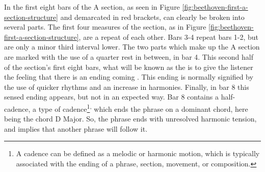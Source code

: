 In the first eight bars of the A section, as seen in Figure \ref{fig:beethoven-first-a-section-structure}\autocite{Henle_1978} and demarcated in red brackets, can clearly be broken into several parts. The first four measures of the section, as in Figure \ref{fig:beethoven-first-a-section-structure}\autocite{Henle_1978}, are a repeat of each other. Bars 3-4 repeat bars 1-2, but are only a minor third interval lower. The two parts which make up the A section are marked with the use of a quarter rest in between, in bar 4. This second half of the section's first eight bars, what will be known as the  is to give the listener the feeling that there is an ending coming \autocite{Kerman_Tyson_Burnham_Johnson_Drabkin_2001}. This ending is normally signified by the use of quicker rhythms and an increase in harmonies. Finally, in bar 8 this sensed ending appears, but not in an expected way. Bar 8 contains a half-cadence, a type of cadence\footnote{A cadence can be defined as a melodic or harmonic motion, which is typically associated with the ending of a phrase, section, movement, or composition.}\textsuperscript{,}\autocite{Nagley_Whittall_2011} which ends the phrase on a dominant chord, here being the chord D Major. So, the phrase ends with unresolved harmonic tension, and implies that another phrase will follow it.

